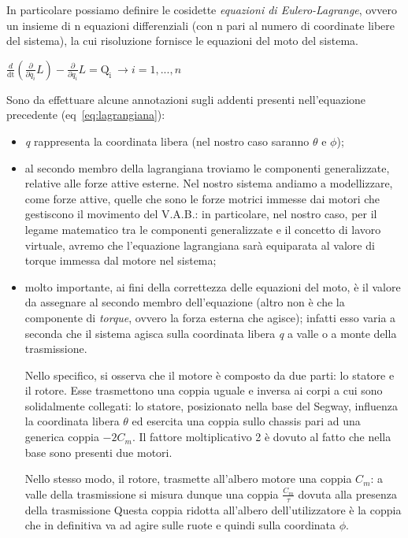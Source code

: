 In particolare possiamo definire le cosidette \textit{equazioni di Eulero-Lagrange}, ovvero un insieme di n equazioni differenziali (con n pari al numero di coordinate libere del sistema), la cui risoluzione fornisce le equazioni del moto del sistema.
\begin{center}
	\label{eq:lagrangiana}
	{\large $\frac{d}{\mathrm{dt}}\left(\frac{\partial }{\partial \dot{q_i} }L\right)-\frac{\partial }{\partial q_i}L=\mathrm{Q_i}\ \rightarrow i = 1,...,n$}
\end{center}

Sono da effettuare alcune annotazioni sugli addenti presenti nell'equazione precedente  (eq~\ref{eq:lagrangiana}):
\begin{itemize}
	\item \textit{q} rappresenta la coordinata libera (nel nostro caso saranno $\theta$ e $\phi$);
	\item al secondo membro della lagrangiana troviamo le componenti generalizzate, relative alle forze attive esterne. Nel nostro sistema andiamo a modellizzare, come forze attive, quelle che sono le forze motrici immesse dai motori che gestiscono il movimento del V.A.B.: in particolare, nel nostro caso, per il legame matematico tra le componenti generalizzate e il concetto di lavoro virtuale, avremo che l'equazione lagrangiana sarà equiparata al valore di torque immessa dal motore nel sistema;
	\item molto importante, ai fini della correttezza delle equazioni del moto, è il valore da assegnare al secondo membro dell'equazione (altro non è che la componente di \textit{torque}, ovvero la forza esterna che agisce); infatti esso varia a seconda che il sistema agisca sulla coordinata libera \textit{q} a valle o a monte della trasmissione.
	
	Nello specifico, si osserva che il motore è composto da due parti: lo statore e il rotore. Esse trasmettono una coppia uguale e inversa ai corpi a cui sono solidalmente collegati: lo statore, posizionato nella base del Segway, influenza la coordinata libera $\theta$ ed esercita una coppia sullo chassis pari ad una generica coppia \textit{$-2 C_m$}.
	Il fattore moltiplicativo 2 è dovuto al fatto che nella base sono presenti due motori.
	
	Nello stesso modo, il rotore, trasmette all'albero motore una coppia \textit{$C_m$}: a valle della trasmissione si misura dunque una coppia \textit{$\frac{C_m}{\tau}$} dovuta alla presenza della trasmissione
	Questa coppia ridotta all'albero dell'utilizzatore è la coppia che in definitiva va ad agire sulle ruote e quindi sulla coordinata $\phi$.
\end{itemize}


